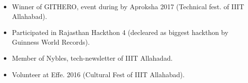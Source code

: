 \begin{itemize}

\footnotesize

\item Winner of GITHERO, event during by Aproksha 2017 (Technical fest. of IIIT Allahabad).

\item Participated in Rajasthan Hackthon 4 (decleared as biggest hackthon by Guinness World Records).

\item Member of Nybles, tech-newsletter of IIIT Allahadad.

\item Volunteer at Effe. 2016 (Cultural Fest of IIIT Allahabad). 

\end{itemize}